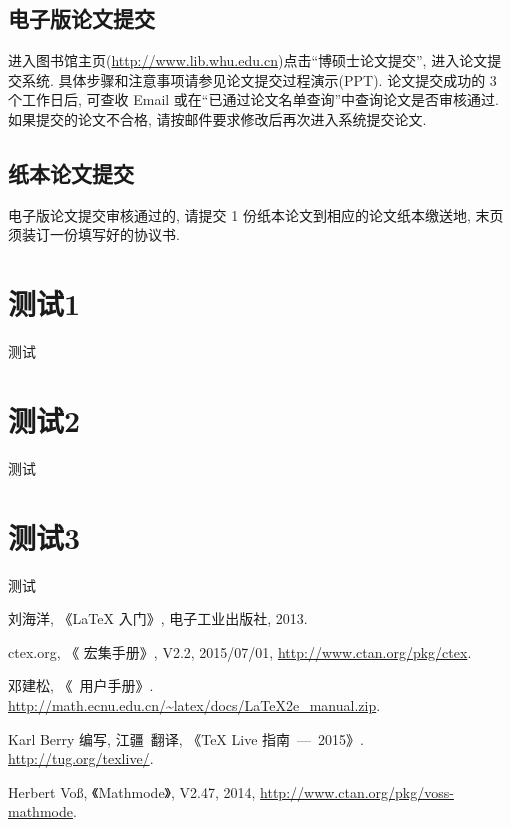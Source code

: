 \documentclass{WHUPhd}  %
\begin{document}
\section*{电子版论文提交}

    进入图书馆主页(\url{http://www.lib.whu.edu.cn})点击``博硕士论文提交'', 进入论文提交系统.
    具体步骤和注意事项请参见论文提交过程演示(PPT).
    论文提交成功的 3 个工作日后, 可查收 Email 或在``已通过论文名单查询''中查询论文是否审核通过.
    如果提交的论文不合格, 请按邮件要求修改后再次进入系统提交论文.


\section*{纸本论文提交}

    电子版论文提交审核通过的, 请提交 1 份纸本论文到相应的论文纸本缴送地,
    末页须装订一份填写好的协议书.


\appendix

\chapter{测试1}

测试

\chapter{测试2}

测试

\chapter{测试3}

测试


\cleardoublepage{}
{}
\begin{thebibliography}{000}

   刘海洋, 《\LaTeX{} 入门》, 电子工业出版社, 2013.

   ctex.org, 《\CTeX{} 宏集手册》, V2.2, 2015/07/01, \url{http://www.ctan.org/pkg/ctex}.

   邓建松, 《\LaTeXe~用户手册》.
             \url{http://math.ecnu.edu.cn/~latex/docs/LaTeX2e_manual.zip}.

   Karl Berry 编写, 江疆~翻译, 《\TeX{} Live 指南\ —\ 2015》.
              \url{http://tug.org/texlive/}.

   Herbert Vo\ss, 《Mathmode》, V2.47, 2014, \url{http://www.ctan.org/pkg/voss-mathmode}.

\end{thebibliography}




\backmatter


\cleardoublepage
\end{document}
